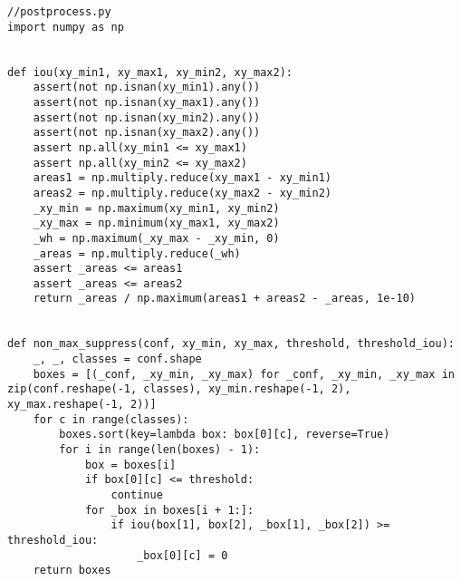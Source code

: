 \pagebreak
\begin{lstlisting}
//postprocess.py
import numpy as np


def iou(xy_min1, xy_max1, xy_min2, xy_max2):
    assert(not np.isnan(xy_min1).any())
    assert(not np.isnan(xy_max1).any())
    assert(not np.isnan(xy_min2).any())
    assert(not np.isnan(xy_max2).any())
    assert np.all(xy_min1 <= xy_max1)
    assert np.all(xy_min2 <= xy_max2)
    areas1 = np.multiply.reduce(xy_max1 - xy_min1)
    areas2 = np.multiply.reduce(xy_max2 - xy_min2)
    _xy_min = np.maximum(xy_min1, xy_min2) 
    _xy_max = np.minimum(xy_max1, xy_max2)
    _wh = np.maximum(_xy_max - _xy_min, 0)
    _areas = np.multiply.reduce(_wh)
    assert _areas <= areas1
    assert _areas <= areas2
    return _areas / np.maximum(areas1 + areas2 - _areas, 1e-10)


def non_max_suppress(conf, xy_min, xy_max, threshold, threshold_iou):
    _, _, classes = conf.shape
    boxes = [(_conf, _xy_min, _xy_max) for _conf, _xy_min, _xy_max in zip(conf.reshape(-1, classes), xy_min.reshape(-1, 2), xy_max.reshape(-1, 2))]
    for c in range(classes):
        boxes.sort(key=lambda box: box[0][c], reverse=True)
        for i in range(len(boxes) - 1):
            box = boxes[i]
            if box[0][c] <= threshold:
                continue
            for _box in boxes[i + 1:]:
                if iou(box[1], box[2], _box[1], _box[2]) >= threshold_iou:
                    _box[0][c] = 0
    return boxes


\end{lstlisting}


